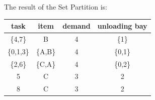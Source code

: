 The result of the Set Partition is:

  \begin{center}
    \begin{tabular}{|c|c|c|c|} \hline
    \textbf{task} & \textbf{item} & \textbf{demand} & \textbf{unloading bay} \\ \hline
    \{4,7\}    & B    & 4     & \{1\}             \\
    \{0,1,3\}  & \{A,B\}& 4    & \{0,1\}             \\
    \{2,6\}    & \{C,A\}    & 4  & \{0,2\}             \\
    5    & C    & 3      & 2             \\
    8    & C    & 3      & 2             \\ \hline       
    \end{tabular}
  \end{center}
